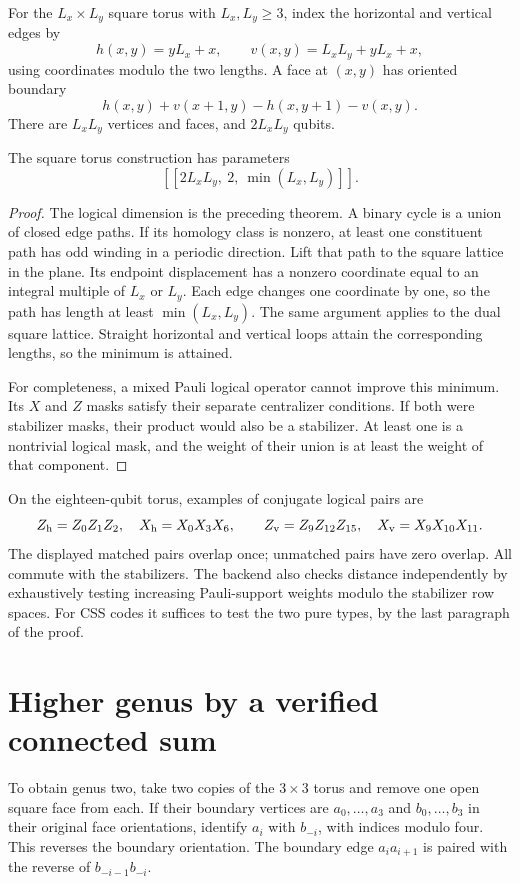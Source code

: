 For the $L_x\times L_y$ square torus with $L_x,L_y\geq3$, index the
horizontal and vertical edges by
\[
 h(x,y)=yL_x+x,\qquad v(x,y)=L_xL_y+yL_x+x,
\]
using coordinates modulo the two lengths.  A face at $(x,y)$ has oriented
boundary
\[
 h(x,y)+v(x+1,y)-h(x,y+1)-v(x,y).
\]
There are $L_xL_y$ vertices and faces, and $2L_xL_y$ qubits.

\begin{proposition}
The square torus construction has parameters
\[
 [[2L_xL_y,\ 2,\ \min(L_x,L_y)]].
\]
\end{proposition}
\begin{proof}
The logical dimension is the preceding theorem.  A binary cycle is a
union of closed edge paths.  If its homology class is nonzero, at least
one constituent path has odd winding in a periodic direction.  Lift that
path to the square lattice in the plane.  Its endpoint displacement has
a nonzero coordinate equal to an integral multiple of $L_x$ or $L_y$.
Each edge changes one coordinate by one, so the path has length at least
$\min(L_x,L_y)$.  The same argument applies to the dual square lattice.
Straight horizontal and vertical loops attain the corresponding lengths,
so the minimum is attained.

For completeness, a mixed Pauli logical operator cannot improve this
minimum.  Its $X$ and $Z$ masks satisfy their separate centralizer
conditions.  If both were stabilizer masks, their product would also
be a stabilizer.  At least one is a nontrivial logical mask, and the
weight of their union is at least the weight of that component.
\end{proof}

On the eighteen-qubit torus, examples of conjugate logical pairs are
\[
 Z_{\rm h}=Z_0Z_1Z_2,\quad X_{\rm h}=X_0X_3X_6,
 \qquad
 Z_{\rm v}=Z_9Z_{12}Z_{15},\quad X_{\rm v}=X_9X_{10}X_{11}.
\]
The displayed matched pairs overlap once; unmatched pairs have zero
overlap.  All commute with the stabilizers.  The backend also checks
distance independently by exhaustively testing increasing Pauli-support
weights modulo the stabilizer row spaces.  For CSS codes it suffices to
test the two pure types, by the last paragraph of the proof.

\section{Higher genus by a verified connected sum}

To obtain genus two, take two copies of the $3\times3$ torus and remove
one open square face from each.  If their boundary vertices are
$a_0,\ldots,a_3$ and $b_0,\ldots,b_3$ in their original face
orientations, identify $a_i$ with $b_{-i}$, with indices modulo four.
This reverses the boundary orientation.  The boundary edge
$a_i a_{i+1}$ is paired with the reverse of
$b_{-i-1}b_{-i}$.

